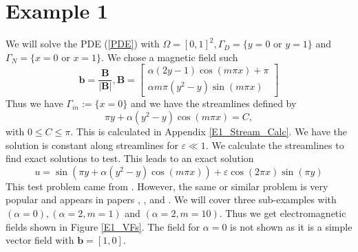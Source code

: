 \documentclass[12pt]{ociamthesis}
\begin{document}
\section{Example 1}
We will solve the PDE (\ref{PDE}) with $\Omega = [0,1]^2, \Gamma_D = \{y=0 \text{ or } y=1\}$ and $\Gamma_N = \{x=0 \text{ or } x=1\}$. We chose a magnetic field such
\begin{equation} \label{E1_b}
\mathbf{b} = \frac{\mathbf{B}}{|\mathbf{B}|}, 
\mathbf{B} = \left[ \begin{matrix}
\alpha(2y-1)\cos(m\pi x) + \pi\\
\alpha m \pi (y^2-y)\sin(m \pi x)
\end{matrix} \right]
\end{equation}
Thus we have $\Gamma_{in}:= \{x=0\}$ and we have the streamlines defined by 
\begin{equation}
\pi y + \alpha (y^2-y) \cos(m\pi x) = C,
\end{equation}
with $0 \leq C \leq \pi$. This is calculated in Appendix \ref{E1_Stream_Calc}. We have the solution is constant along streamlines for $\varepsilon \ll 1$. We calculate the streamlines to find exact solutions to test. This leads to an exact solution 
\begin{equation} \label{E1_u}
u = \sin(\pi y + \alpha (y^2-y) \cos(m\pi x)) + \varepsilon \cos(2 \pi x) \sin(\pi y)
\end{equation}
This test problem came from \cite{DN}. However, the same or similar problem is very popular and appears in papers \cite{LINE_INT}, \cite{AP}, \cite{MMAP} and \cite{STAB}. We will cover three sub-examples with $(\alpha=0),(\alpha=2,m=1)$ and $(\alpha = 2, m=10)$. Thus we get electromagnetic fields shown in Figure \ref{E1_VFs}. The field for $\alpha = 0$ is not shown as it is a simple vector field with $\mathbf{b}= [1, 0]$.
\end{document}
